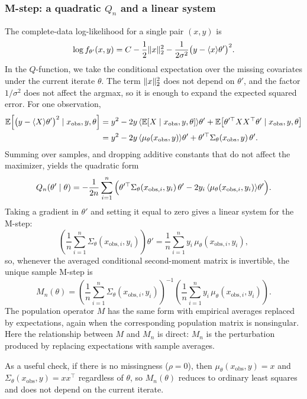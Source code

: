 \documentclass[11pt]{article}
\begin{document}
\subsubsection{M-step: a quadratic \texorpdfstring{$Q_n$}{Qn} and a linear system}
\label{subsubsec:missing-covariates-mstep}

The complete-data log-likelihood for a single pair $(x,y)$ is
\[
\log f_{\theta'}(x,y)
=
C
-\frac{1}{2}\lVert x\rVert_2^2
-\frac{1}{2\sigma^2}\big(y-\langle x\rangle{\theta'}\big)^2.
\]
In the $Q$-function, we take the conditional expectation over the missing covariates under the current iterate $\theta$.
The term $\lVert x\rVert_2^2$ does not depend on $\theta'$, and the factor $1/\sigma^2$ does not affect the argmax, so it is enough to expand the expected squared error.
For one observation,
\begin{align*}
\mathbb{E}\Big[\big(y-\langle X\rangle{\theta'}\big)^2\mid x_{\mathrm{obs}},y,\theta\Big]
&=
y^2 - 2y\,\langle\mathbb{E}[X\mid x_{\mathrm{obs}},y,\theta]\rangle{\theta'}
  + \mathbb{E}\big[\theta'^\top XX^\top \theta'\mid x_{\mathrm{obs}},y,\theta\big] \\
&=
y^2 - 2y\,\langle\mu_\theta(x_{\mathrm{obs}},y)\rangle{\theta'}
  + \theta'^\top \Sigma_\theta(x_{\mathrm{obs}},y)\,\theta'.
\end{align*}
Summing over samples, and dropping additive constants that do not affect the maximizer, yields the quadratic form
\[
Q_n(\theta'\mid\theta)
=
-\frac{1}{2n}\sum_{i=1}^n
\Big(\theta'^\top \Sigma_\theta(x_{\mathrm{obs},i},y_i)\,\theta'
-2y_i\,\langle\mu_\theta(x_{\mathrm{obs},i},y_i)\rangle{\theta'}\Big).
\]
Taking a gradient in $\theta'$ and setting it equal to zero gives a linear system for the M-step:
\[
\left(\frac{1}{n}\sum_{i=1}^n \Sigma_\theta(x_{\mathrm{obs},i},y_i)\right)\theta'
=
\frac{1}{n}\sum_{i=1}^n y_i\,\mu_\theta(x_{\mathrm{obs},i},y_i),
\]
so, whenever the averaged conditional second-moment matrix is invertible, the unique sample M-step is
\[
M_n(\theta)
=
\left(\frac{1}{n}\sum_{i=1}^n \Sigma_\theta(x_{\mathrm{obs},i},y_i)\right)^{-1}
\left(\frac{1}{n}\sum_{i=1}^n y_i\,\mu_\theta(x_{\mathrm{obs},i},y_i)\right).
\]
The population operator $M$ has the same form with empirical averages replaced by expectations, again when the corresponding population matrix is nonsingular.
Here the relationship between $M$ and $M_n$ is direct: $M_n$ is the perturbation produced by replacing expectations with sample averages.

As a useful check, if there is no missingness ($\rho=0$), then $\mu_\theta(x_{\mathrm{obs}},y)=x$ and $\Sigma_\theta(x_{\mathrm{obs}},y)=xx^\top$ regardless of $\theta$, so $M_n(\theta)$ reduces to ordinary least squares and does not depend on the current iterate.
\end{document}
